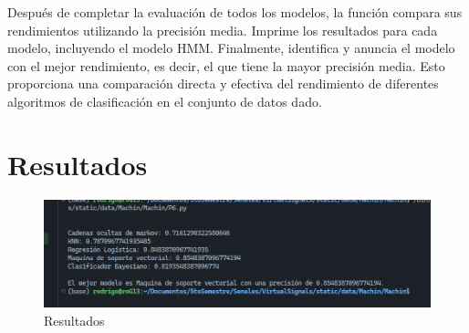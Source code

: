 \documentclass[12pt]{article}
\begin{document}
Después de completar la evaluación de todos los modelos, la función compara sus rendimientos utilizando la precisión media. Imprime los resultados para cada modelo, incluyendo el modelo HMM. Finalmente, identifica y anuncia el modelo con el mejor rendimiento, es decir, el que tiene la mayor precisión media. Esto proporciona una comparación directa y efectiva del rendimiento de diferentes algoritmos de clasificación en el conjunto de datos dado.

\vspace{1cm}
\clearpage
\section*{Resultados}

	\begin{figure}[h]
	\centering %
	\includegraphics[width=1\textwidth]{fotomarkov.png} %
	\caption{Resultados} %
	\label{fig:imagen2} %
\end{figure}


\clearpage
\end{document}
